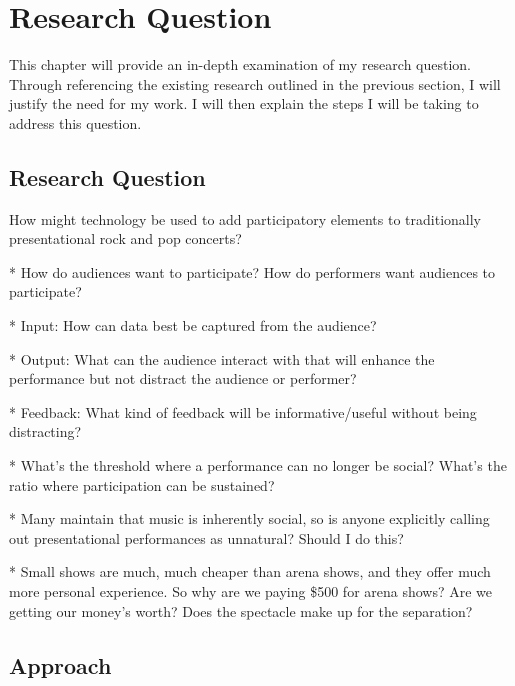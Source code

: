 \chapter{Research Question}

This chapter will provide an in-depth examination of my research question. Through referencing the existing research outlined in the previous section, I will justify the need for my work. I will then explain the steps I will be taking to address this question.

\section{Research Question}

How might technology be used to add participatory elements to traditionally presentational rock and pop concerts?

* How do audiences want to participate? How do performers want audiences to participate?

* Input: How can data best be captured from the audience?

* Output: What can the audience interact with that will enhance the performance but not distract the audience or performer?

* Feedback: What kind of feedback will be informative/useful without being distracting?

* What's the threshold where a performance can no longer be social? What's the ratio where participation can be sustained?

* Many maintain that music is inherently social, so is anyone explicitly calling out presentational performances as unnatural? Should I do this?

* Small shows are much, much cheaper than arena shows, and they offer much more personal experience. So why are we paying \$500 for arena shows? Are we getting our money's worth? Does the spectacle make up for the separation?


\section{Approach}
